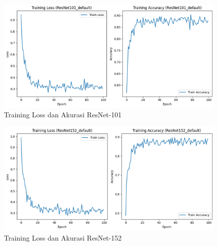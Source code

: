    \begin{figure}[H]
        \includegraphics[scale=0.8]{gambar/TrainingGraphResNet101.png}
        \caption{Training Loss dan Akurasi ResNet-101}
        \label{Img:GraphResNet101}
    \end{figure}
    \begin{figure}[H]
        \includegraphics[scale=0.8]{gambar/TrainingGraphResNet152.png}
        \caption{Training Loss dan Akurasi ResNet-152}
        \label{Img:GraphResNet152}
    \end{figure}

